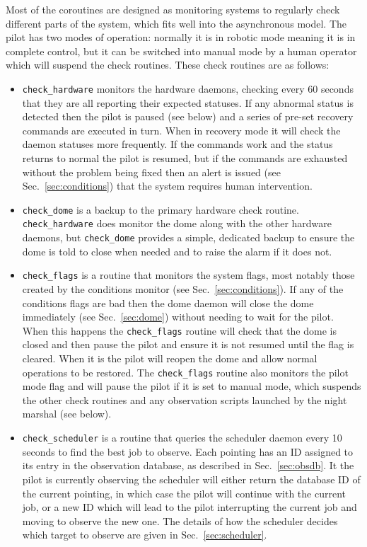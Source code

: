 \begin{colsection}
\begin{colsection}
Most of the coroutines are designed as monitoring systems to regularly check different parts of the system, which fits well into the asynchronous model. The pilot has two modes of operation: normally it is in robotic mode meaning it is in complete control, but it can be switched into manual mode by a human operator which will suspend the check routines. These check routines are as follows:

\begin{itemize}

\item \texttt{check\_hardware} monitors the hardware daemons, checking every 60 seconds that they are all reporting their expected statuses. If any abnormal status is detected then the pilot is paused (see below) and a series of pre-set recovery commands are executed in turn. When in recovery mode it will check the daemon statuses more frequently. If the commands work and the status returns to normal the pilot is resumed, but if the commands are exhausted without the problem being fixed then an alert is issued (see Sec.~\ref{sec:conditions}) that the system requires human intervention.

\item \texttt{check\_dome} is a backup to the primary hardware check routine. \texttt{check\_hardware} does monitor the dome along with the other hardware daemons, but \texttt{check\_dome} provides a simple, dedicated backup to ensure the dome is told to close when needed and to raise the alarm if it does not.

\item \texttt{check\_flags} is a routine that monitors the system flags, most notably those created by the conditions monitor (see Sec.~\ref{sec:conditions}). If any of the conditions flags are bad then the dome daemon will close the dome immediately (see Sec.~\ref{sec:dome}) without needing to wait for the pilot. When this happens the \texttt{check\_flags} routine will check that the dome is closed and then pause the pilot and ensure it is not resumed until the flag is cleared. When it is the pilot will reopen the dome and allow normal operations to be restored. The \texttt{check\_flags} routine also monitors the pilot mode flag and will pause the pilot if it is set to manual mode, which suspends the other check routines and any observation scripts launched by the night marshal (see below).

\item \texttt{check\_scheduler} is a routine that queries the scheduler daemon every 10 seconds to find the best job to observe. Each pointing has an ID assigned to its entry in the observation database, as described in Sec.~\ref{sec:obsdb}. It the pilot is currently observing the scheduler will either return the database ID of the current pointing, in which case the pilot will continue with the current job, or a new ID which will lead to the pilot interrupting the current job and moving to observe the new one. The details of how the scheduler decides which target to observe are given in Sec.~\ref{sec:scheduler}.


\end{itemize}
\end{colsection}
\end{colsection}

